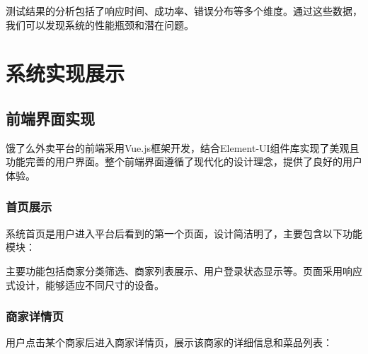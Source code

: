 \documentclass[a4paper,12pt]{article}
\begin{document}
测试结果的分析包括了响应时间、成功率、错误分布等多个维度。通过这些数据，我们可以发现系统的性能瓶颈和潜在问题。

\section{系统实现展示}

\subsection{前端界面实现}

饿了么外卖平台的前端采用Vue.js框架开发，结合Element-UI组件库实现了美观且功能完善的用户界面。整个前端界面遵循了现代化的设计理念，提供了良好的用户体验。

\subsubsection{首页展示}

系统首页是用户进入平台后看到的第一个页面，设计简洁明了，主要包含以下功能模块：

\begin{figure}[H]
\centering
{}
\end{figure}

主要功能包括商家分类筛选、商家列表展示、用户登录状态显示等。页面采用响应式设计，能够适应不同尺寸的设备。

\subsubsection{商家详情页}

用户点击某个商家后进入商家详情页，展示该商家的详细信息和菜品列表：
\end{document}
